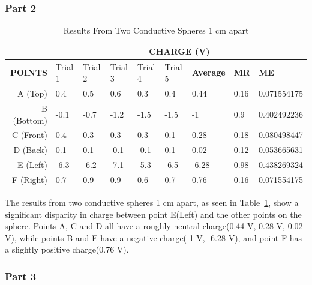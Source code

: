 \subsubsection{Part 2}

\begin{table}[h]
    \caption{\label{tab:table2}Results From Two Conductive Spheres 1 cm apart}
    \centering
    \begin{tabular}{@{}rllllllll@{}}
    \toprule
    & \multicolumn{8}{c}{\textbf{CHARGE (V)}} \\
    \midrule
    \textbf{POINTS} & Trial 1 & Trial 2 & Trial 3 & Trial 4 & Trial 5 & \textbf{Average} & \textbf{MR} & \textbf{ME} \\
    A (Top) & 0.4 & 0.5 & 0.6 & 0.3 & 0.4 & 0.44 & 0.16 & 0.071554175 \\
    B (Bottom) & -0.1 & -0.7 & -1.2 & -1.5 & -1.5 & -1 & 0.9 & 0.402492236 \\
    C (Front) & 0.4 & 0.3 & 0.3 & 0.3 & 0.1 & 0.28 & 0.18 & 0.080498447 \\
    D (Back) & 0.1 & 0.1 & -0.1 & -0.1 & 0.1 & 0.02 & 0.12 & 0.053665631 \\
    E (Left) & -6.3 & -6.2 & -7.1 & -5.3 & -6.5 & -6.28 & 0.98 & 0.438269324 \\
    F (Right) & 0.7 & 0.9 & 0.9 & 0.6 & 0.7 & 0.76 & 0.16 & 0.071554175 \\
    \bottomrule
    \end{tabular}
\end{table}

The results from two conductive spheres 1 cm apart, as seen in Table~\ref{tab:table2}, show a significant disparity in charge between point E(Left) and the other points on the sphere. Points A, C and D all have a roughly neutral charge(0.44 V, 0.28 V, 0.02 V), while points B and E have a negative charge(-1 V, -6.28 V), and point F has a slightly positive charge(0.76 V).

\subsubsection{Part 3}

